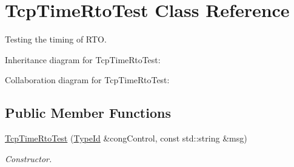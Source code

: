 \hypertarget{classTcpTimeRtoTest}{}\section{Tcp\+Time\+Rto\+Test Class Reference}
\label{classTcpTimeRtoTest}


Testing the timing of R\+TO.  




Inheritance diagram for Tcp\+Time\+Rto\+Test\+:


Collaboration diagram for Tcp\+Time\+Rto\+Test\+:
\subsection*{Public Member Functions}
\begin{DoxyCompactItemize}
\item 
\hyperlink{classTcpTimeRtoTest_aacb6556df47cc733b6342ae48ca70b16}{Tcp\+Time\+Rto\+Test} (\hyperlink{classns3_1_1TypeId}{Type\+Id} \&cong\+Control, const std\+::string \&msg)
\begin{DoxyCompactList}\small\item\em Constructor. \end{DoxyCompactList}\end{DoxyCompactItemize}
